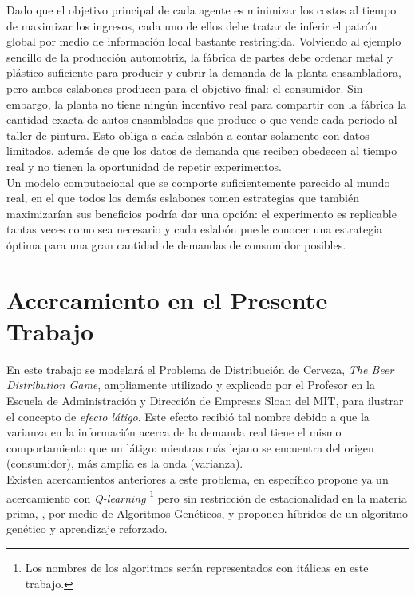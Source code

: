 Dado que el objetivo principal de cada agente es minimizar los costos al tiempo de maximizar los ingresos, cada uno de ellos debe tratar de inferir el patrón global por medio de información local bastante restringida. Volviendo al ejemplo sencillo de la producci\'on automotriz, la f\'abrica de partes debe ordenar metal y pl\'astico suficiente para producir y cubrir la demanda de la planta ensambladora, pero ambos eslabones producen para el objetivo final: el consumidor. Sin embargo, la planta no tiene ning\'un incentivo real para compartir con la f\'abrica la cantidad exacta de autos ensamblados que produce o que vende cada periodo al taller de pintura. Esto obliga a cada eslab\'on a contar solamente con datos limitados, adem\'as de que los datos de demanda que reciben obedecen al tiempo real y no tienen la oportunidad de repetir experimentos.\\

Un modelo computacional que se comporte suficientemente parecido al mundo real, en el que todos los demás eslabones tomen estrategias que también maximizarían sus beneficios podría dar una opción: el experimento es replicable tantas veces como sea necesario y cada eslabón puede conocer una estrategia óptima para una gran cantidad de demandas de consumidor posibles.\\

\section{Acercamiento en el Presente Trabajo}

En este trabajo se modelará el Problema de Distribución de Cerveza, \textit{The Beer Distribution Game}, ampliamente utilizado y explicado por el Profesor \citet{Sterman} en la Escuela de Administraci\'on y Direcci\'on de Empresas Sloan del MIT, para ilustrar el concepto de \textit{efecto l\'atigo}. Este efecto recibi\'o tal nombre debido a que la varianza en la informaci\'on acerca de la demanda real tiene el mismo comportamiento que un l\'atigo: mientras m\'as lejano se encuentra del origen (consumidor), m\'as amplia es la onda (varianza).\\

Existen acercamientos anteriores a este problema, en espec\'ifico \citet{Chaharsooghi} propone ya un acercamiento con \textit{Q-learning} \footnote{Los nombres de los algoritmos ser\'an representados con it\'alicas en este trabajo.} pero sin restricci\'on de estacionalidad en la materia prima, \citet{Strozzi}, por medio de Algoritmos Genéticos, \citet{} y \citet{Zarandi} proponen h\'ibridos de un algoritmo gen\'etico y aprendizaje reforzado.\\

